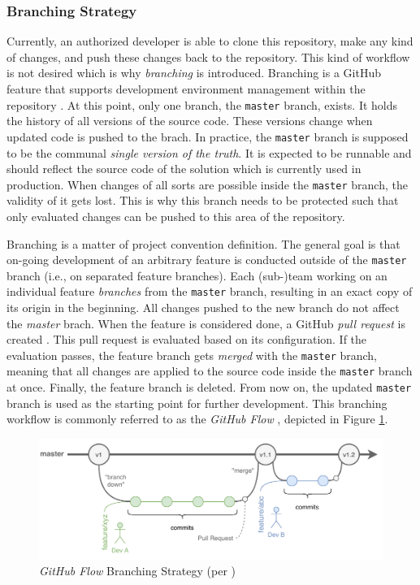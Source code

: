 \subsubsection{Branching Strategy}
Currently, an authorized developer is able to clone this repository, make any kind of changes, and push these changes back to the repository. This kind of workflow is not desired which is why \textit{branching} is introduced. Branching is a GitHub feature that supports development environment management within the repository \cite[62\psqq]{Chacon2020}. At this point, only one branch, the \texttt{master} branch, exists. It holds the history of all versions of the source code. These versions change when updated code is pushed to the brach. In practice, the \texttt{master} branch is supposed to be the communal \textit{single version of the truth}. It is expected to be runnable and should reflect the source code of the solution which is currently used in production. When changes of all sorts are possible inside the \texttt{master} branch, the validity of it gets lost. This is why this branch needs to be protected such that only evaluated changes can be pushed to this area of the repository.

Branching is a matter of project convention definition. The general goal is that on-going development of an arbitrary feature is conducted outside of the \texttt{master} branch (i.e., on separated feature branches). Each (sub-)team working on an individual feature \textit{branches} from the \texttt{master} branch, resulting in an exact copy of its origin in the beginning. All changes pushed to the new branch do not affect the \textit{master} brach. When the feature is considered done, a GitHub \textit{pull request} is created \cite{github}. This pull request is evaluated based on its configuration. If the evaluation passes, the feature branch gets \textit{merged} with the \texttt{master} branch, meaning that all changes are applied to the source code inside the \texttt{master} branch at once. Finally, the feature branch is deleted. From now on, the updated \texttt{master} branch is used as the starting point for further development. This branching workflow is commonly referred to as the \textit{GitHub Flow} \cite{GitHub2020}, depicted in Figure \ref{fig:5-github-flow}.
\newpage
\begin{figure}[h!]
	\centering
	\includegraphics[width=\linewidth]{main-matter/img/5-github-flow.pdf}
	\caption[\textit{GitHub Flow} Branching Strategy]{\textit{GitHub Flow} Branching Strategy (per \cite{GitHub2020})}
	\label{fig:5-github-flow}
\end{figure}

